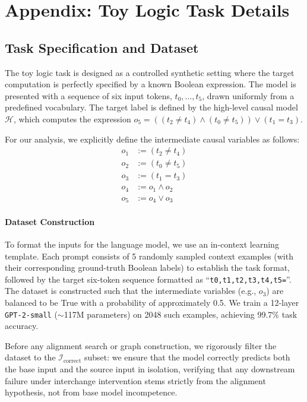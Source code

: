 \section{Appendix: Toy Logic Task Details}
\label{appendix:logic}
\subsection{Task Specification and Dataset}
The toy logic task is designed as a controlled synthetic setting where the target computation is perfectly specified by a known Boolean expression. The model is presented with a sequence of six input tokens, $t_0, \dots, t_5$, drawn uniformly from a predefined vocabulary. The target label is defined by the high-level causal model $\mathcal{H}$, which computes the expression $o_5 = ((t_2 \neq t_4) \land (t_0 \neq t_5)) \lor (t_1 = t_3)$.

For our analysis, we explicitly define the intermediate causal variables as follows:
\begin{align*}
    o_1 &:= (t_2 \neq t_4) \\
    o_2 &:= (t_0 \neq t_5) \\
    o_3 &:= (t_1 = t_3) \\
    o_4 &:= o_1 \land o_2 \\
    o_5 &:= o_4 \lor o_3
\end{align*}

\paragraph{Dataset Construction}
To format the inputs for the language model, we use an in-context learning template. Each prompt consists of 5 randomly sampled context examples (with their corresponding ground-truth Boolean labels) to establish the task format, followed by the target six-token sequence formatted as ``\texttt{t0,t1,t2,t3,t4,t5=}''. The dataset is constructed such that the intermediate variables (e.g., $o_3$) are balanced to be True with a probability of approximately 0.5. We train a 12-layer \texttt{GPT-2-small} ($\sim$117M parameters) on 2048 such examples, achieving 99.7\% task accuracy. 

Before any alignment search or graph construction, we rigorously filter the dataset to the $\mathcal{I}_{\mathrm{correct}}$ subset: we ensure that the model correctly predicts both the base input and the source input in isolation, verifying that any downstream failure under interchange intervention stems strictly from the alignment hypothesis, not from base model incompetence.

